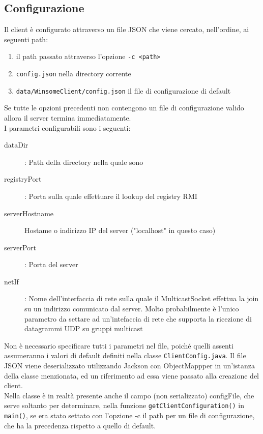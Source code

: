 \subsection{Configurazione}
Il client è configurato attraverso un file JSON che viene cercato, nell'ordine, ai seguenti path:
\begin{enumerate}
	\item il path passato attraverso l'opzione \verb|-c <path>|
	\item \verb|config.json| nella directory corrente
	\item \verb|data/WinsomeClient/config.json| il file di configurazione di default
\end{enumerate}
Se tutte le opzioni precedenti non contengono un file di configurazione valido allora il server termina immediatamente.\\
I parametri configurabili sono i seguenti:

\begin{description}
	\item[dataDir]: Path della directory nella quale sono 
	\item[registryPort]: Porta sulla quale effettuare il lookup del registry RMI
	\item[serverHostname] Hostame o indirizzo IP del server ("localhost" in questo caso)
	\item[serverPort]: Porta del server
	\item[netIf]: Nome dell'interfaccia di rete sulla quale il MulticastSocket effettua la join su un indirizzo comunicato dal server. Molto probabilmente è l'unico parametro da settare ad un'intefaccia di rete che supporta la ricezione di datagrammi UDP su gruppi multicast
\end{description}

Non è necessario specificare tutti i parametri nel file, poiché quelli assenti assumeranno i valori di default definiti nella classe \verb|ClientConfig.java|. Il file JSON viene deserializzato utilizzando Jackson con ObjectMappper in un'istanza della classe menzionata, ed un riferimento ad essa viene passato alla creazione del client.\\
Nella classe è in realtà presente anche il campo (non serializzato) configFile, che serve soltanto per determinare, nella funzione \verb|getClientConfiguration()| in \verb|main()|, se era stato settato con l'opzione -c il path per un file di configurazione, che ha la precedenza rispetto a quello di default.

